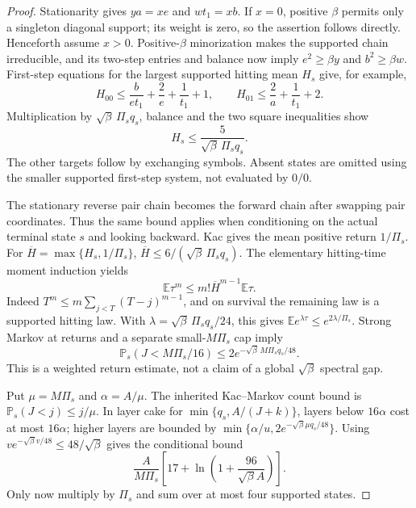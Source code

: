 \documentclass[11pt,letterpaper]{article}
\theoremstyle{definition}\newtheorem{definition}[theorem]{Definition}
\theoremstyle{remark}\newtheorem{remark}[theorem]{Remark}
\newcommand{\E}{\mathbb{E}}
\newcommand{\Prob}{\mathbb{P}}
\begin{document}
\begin{proof}
Stationarity gives $ya=xe$ and $wt_1=xb$. If $x=0$, positive $\beta$ permits only a singleton diagonal support; its weight is zero, so the assertion follows directly. Henceforth assume $x>0$. Positive-$\beta$ minorization makes the supported chain irreducible, and its two-step entries and balance now imply $e^2\ge\beta y$ and $b^2\ge\beta w$. First-step equations for the largest supported hitting mean $H_s$ give, for example,
\[
 H_{00}\le\frac{b}{et_1}+\frac2e+\frac1{t_1}+1,\qquad
 H_{01}\le\frac2a+\frac1{t_1}+2.
\]
Multiplication by $\sqrt\beta\,\Pi_s q_s$, balance and the two square inequalities show
\[
 H_s\le\frac5{\sqrt\beta\,\Pi_s q_s}.
\]
The other targets follow by exchanging symbols. Absent states are omitted using the smaller supported first-step system, not evaluated by $0/0$.

The stationary reverse pair chain becomes the forward chain after swapping pair coordinates. Thus the same bound applies when conditioning on the actual terminal state $s$ and looking backward. Kac gives the mean positive return $1/\Pi_s$. For $\overline H=\max\{H_s,1/\Pi_s\}$,
$\overline H\le6/(\sqrt\beta\,\Pi_sq_s)$.
The elementary hitting-time moment induction yields
\[
 \E\tau^m\le m!\overline H^{m-1}\E\tau .
\]
Indeed $T^m\le m\sum_{j<T}(T-j)^{m-1}$, and on survival the remaining law is a supported hitting law. With
$\lambda=\sqrt\beta\,\Pi_sq_s/24$, this gives
$\E e^{\lambda\tau}\le e^{2\lambda/\Pi_s}$.
Strong Markov at returns and a separate small-$M\Pi_s$ cap imply
\[
 \Prob_s(J<M\Pi_s/16)
 \le2e^{-\sqrt\beta\,M\Pi_sq_s/48}.
\]
This is a weighted return estimate, not a claim of a global $\sqrt\beta$ spectral gap.

Put $\mu=M\Pi_s$ and $\alpha=A/\mu$. The inherited Kac--Markov count bound is
$\Prob_s(J<j)\le j/\mu$. In layer cake for
$\min\{q_s,A/(J+k)\}$, layers below $16\alpha$ cost at most $16\alpha$; higher layers are bounded by
$\min\{\alpha/u,2e^{-\sqrt\beta\mu q_s/48}\}$.
Using $v e^{-\sqrt\beta v/48}\le48/\sqrt\beta$ gives the conditional bound
\[
 \frac{A}{M\Pi_s}
 \left[17+\ln\left(1+\frac{96}{\sqrt\beta A}\right)\right].
\]
Only now multiply by $\Pi_s$ and sum over at most four supported states.
\end{proof}
\end{document}
